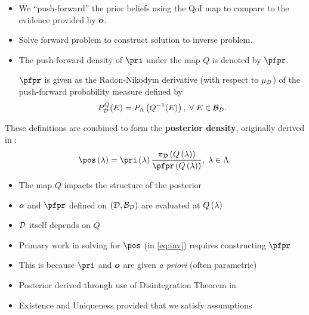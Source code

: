 \begin{frame}[t]
\begin{itemize}
	\item <1->We ``push-forward'' the prior beliefs using the QoI map to compare to the evidence provided by $\operatorname*{\boldsymbol{o}}$. 
	\item <2-> Solve forward problem to construct solution to inverse problem. 
	\item <3-> The push-forward density of $\pri$ under the map $Q$ is denoted by $\pfpr$. 
	\begin{defn}\label{defn:pfprior}
$\pfpr$ is given as the Radon-Nikodym derivative (with respect to $\mu_{\mathcal{D}}$) of the push-forward probability measure defined by 
\begin{equation}\label{eq:pfpr}
P_{\mathcal{D}}^Q (E)  = P_{\Lambda} \left ( Q^{-1}(E) \right ), \; \forall \; E \in \mathcal{B}_{\mathcal{D}}.
\end{equation}
\end{defn}

\end{itemize}

\end{frame}

\begin{frame}[t]
These definitions are combined to form the \textbf{posterior density}, originally derived in \cite{BJW18}:
\begin{equation}\label{eq:post}
\pos \lam = \pri \lam \frac{\pi_\dspace \q }{\pfpr \q }, \; \lambda \in \pspace.
\end{equation}

\begin{itemize}
	\item <1-> The map $Q$ impacts the structure of the posterior
	\item <2-> $\operatorname*{\boldsymbol{o}}$ and $\pfpr$ defined on $(\mathcal{D}, \mathcal{B}_{\mathcal{D}})$ are evaluated at $Q\left ( \lambda \right )$
	\item <2-> $\mathcal{D}$ itself depends on $Q$
	\item <3-> Primary work in solving for $\pos$ (in \eqref{eq:inv}) requires constructing $\pfpr$
	\item <4-> This is because $\pri$ and $\operatorname*{\boldsymbol{o}}$ are given \emph{a priori} (often parametric)
	\item <5-> Posterior derived through use of Disintegration Theorem in \cite{BJW18}
	\item <6-> Existence and Uniqueness provided that we satisfy assumptions
\end{itemize}
\end{frame}



